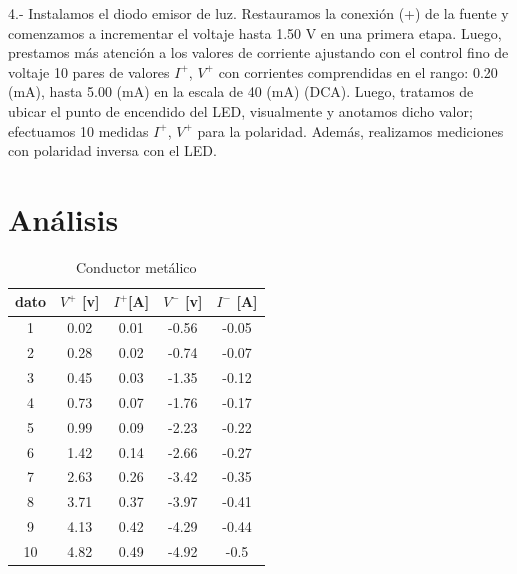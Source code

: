 \documentclass[]{article}
\begin{document}
4.- Instalamos el diodo emisor de luz. Restauramos la conexión (+) de la fuente y comenzamos a incrementar el voltaje
hasta 1.50 V en una primera etapa. Luego, prestamos más atención a los valores de corriente ajustando con el control 
fino de voltaje 10 pares de valores $I^{+}$, $V^{+}$ con corrientes comprendidas en el rango: 0.20 (mA), hasta 5.00 (mA)
en la escala de 40 (mA) (DCA). Luego, tratamos de ubicar el punto de encendido del LED, visualmente y anotamos dicho valor; efectuamos
10 medidas $I^{+}$, $V^{+}$ para la polaridad. Además, realizamos mediciones con polaridad inversa con el LED.











\section*{Análisis}

\begin{table}
  \centering
  \begin{tabular}{|c|c|c|c|c|} \hline
    dato    &   $V^{+}$ [v]  &    $I^{+}$[A]  &   $V^{-}$ [v]  &    $I^{-}$ [A]  \\ \hline
    1       & 0.02 &0.01   &-0.56 &-0.05 \\ \hline
    2      &0.28  &0.02     &-0.74 &-0.07 \\ \hline
    3      &0.45  &0.03     &-1.35 &-0.12 \\ \hline
    4       &0.73  &0.07    &-1.76 &-0.17 \\ \hline
    5       &0.99  &0.09    &-2.23 &-0.22 \\ \hline
    6       &1.42  &0.14    &-2.66 &-0.27 \\ \hline
    7       &2.63  &0.26    &-3.42 &-0.35 \\ \hline
    8       &3.71  &0.37    &-3.97 &-0.41 \\ \hline
    9       &4.13  &0.42    &-4.29 &-0.44 \\ \hline
    10       &4.82  &0.49   &-4.92 &-0.5 \\ \hline

  \end{tabular}
  \caption{\label{tab: transitor} Conductor metálico}
\end{table}
\end{document}
